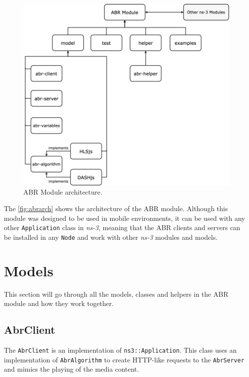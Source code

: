 \begin{figure}[]
  \centering
  \includegraphics[width=\textwidth]{img/abr.png}
  \caption{ABR Module architecture.}
  \label{fig:abrarch}
\end{figure}

The \autoref{fig:abrarch} shows the architecture of the ABR module. Although this module 
was designed to be used in mobile environments, it can be used with any other \texttt{Application} 
class in \textit{ns-3}, meaning that the ABR clients and servers can be installed in any \texttt{Node}
and work with other \textit{ns-3} modules and models.


\section{Models}
\label{sec:abrmodels}
This section will go through all the models, classes and helpers in the ABR module and how they work 
together.


\subsection{AbrClient}
The \texttt{AbrClient} is an implementation of \texttt{ns3::Application}. This class 
uses an implementation of \texttt{AbrAlgorithm} to create HTTP-like requests to the 
\texttt{AbrServer} and mimics the playing of the media content.

